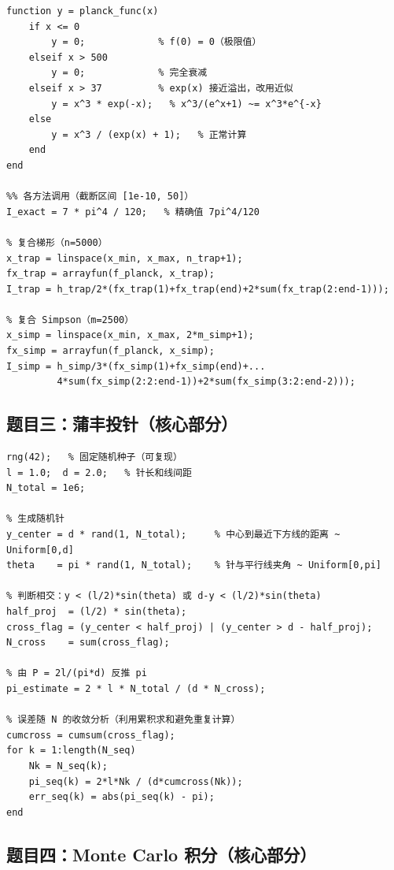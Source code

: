 \documentclass[UTF8,a4paper,11pt]{article}
\begin{document}
\begin{lstlisting}[style=matlab, caption={problem2\_planck\_integral.m（稳健 Planck 函数）}]
%% 被积函数（数值稳健版本）
function y = planck_func(x)
    if x <= 0
        y = 0;             % f(0) = 0（极限值）
    elseif x > 500
        y = 0;             % 完全衰减
    elseif x > 37          % exp(x) 接近溢出，改用近似
        y = x^3 * exp(-x);   % x^3/(e^x+1) ~= x^3*e^{-x}
    else
        y = x^3 / (exp(x) + 1);   % 正常计算
    end
end

%% 各方法调用（截断区间 [1e-10, 50]）
I_exact = 7 * pi^4 / 120;   % 精确值 7pi^4/120

% 复合梯形（n=5000）
x_trap = linspace(x_min, x_max, n_trap+1);
fx_trap = arrayfun(f_planck, x_trap);
I_trap = h_trap/2*(fx_trap(1)+fx_trap(end)+2*sum(fx_trap(2:end-1)));

% 复合 Simpson（m=2500）
x_simp = linspace(x_min, x_max, 2*m_simp+1);
fx_simp = arrayfun(f_planck, x_simp);
I_simp = h_simp/3*(fx_simp(1)+fx_simp(end)+...
         4*sum(fx_simp(2:2:end-1))+2*sum(fx_simp(3:2:end-2)));
\end{lstlisting}

\subsection{题目三：蒲丰投针（核心部分）}

\begin{lstlisting}[style=matlab, caption={problem3\_buffon\_needle.m（核心算法）}]
rng(42);   % 固定随机种子（可复现）
l = 1.0;  d = 2.0;   % 针长和线间距
N_total = 1e6;

% 生成随机针
y_center = d * rand(1, N_total);     % 中心到最近下方线的距离 ~ Uniform[0,d]
theta    = pi * rand(1, N_total);    % 针与平行线夹角 ~ Uniform[0,pi]

% 判断相交：y < (l/2)*sin(theta) 或 d-y < (l/2)*sin(theta)
half_proj  = (l/2) * sin(theta);
cross_flag = (y_center < half_proj) | (y_center > d - half_proj);
N_cross    = sum(cross_flag);

% 由 P = 2l/(pi*d) 反推 pi
pi_estimate = 2 * l * N_total / (d * N_cross);

% 误差随 N 的收敛分析（利用累积求和避免重复计算）
cumcross = cumsum(cross_flag);
for k = 1:length(N_seq)
    Nk = N_seq(k);
    pi_seq(k) = 2*l*Nk / (d*cumcross(Nk));
    err_seq(k) = abs(pi_seq(k) - pi);
end
\end{lstlisting}

\subsection{题目四：Monte Carlo 积分（核心部分）}
\end{document}
